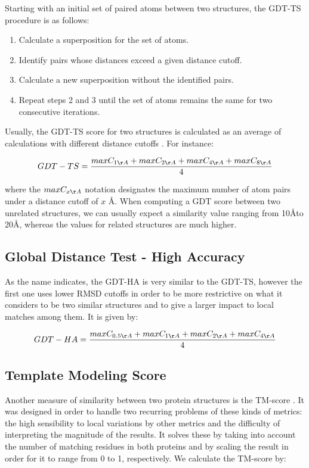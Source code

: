 Starting with an initial set of paired atoms between two structures, the GDT-TS procedure is as follows:
\begin{enumerate}
	\item Calculate a superposition for the set of atoms.
	\item Identify pairs whose distances exceed a given distance cutoff.
	\item Calculate a new superposition without the identified pairs.
	\item Repeat steps 2 and 3 until the set of atoms remains the same for two consecutive iterations.
\end{enumerate}

Usually, the GDT-TS score for two structures is calculated as an average of calculations with different distance cutoffs \cite{poleksic2009algorithms}. For instance:

$$ GDT-TS = \frac{ max C_{1\AA} + max C_{2\AA} + max C_{4\AA} + max C_{8\AA} } {4} $$
	
where the $max C_{x\AA}$ notation designates the maximum number of atom pairs under a distance cutoff of $x$ \AA. When computing a GDT score between two unrelated structures, we can usually expect a similarity value ranging from 10\AA to 20\AA, whereas the values for related structures are much higher. \cite{herbert2008maxcluster}

\medskip
\subsection{Global Distance Test - High Accuracy}

As the name indicates, the \gls{GDT-HA} is very similar to the GDT-TS, however the first one uses lower RMSD cutoffs in order to be more restrictive on what it considers to be two similar structures and to give a larger impact to local matches among them. It is given by:

$$ GDT-HA = \frac{ max C_{0.5\AA} + max C_{1\AA} + max C_{2\AA} + max C_{4\AA} } {4} $$

\subsection{Template Modeling Score}

Another measure of similarity between two protein structures is the \gls{TM-score} \cite{zhang2004scoring}. It was designed in order to handle two recurring problems of these kinds of metrics: the high sensibility to local variations by other metrics and the difficulty of interpreting the magnitude of the results. It solves these by taking into account the number of matching residues in both proteins and by scaling the result in order for it to range from 0 to 1, respectively. We calculate the TM-score by:

